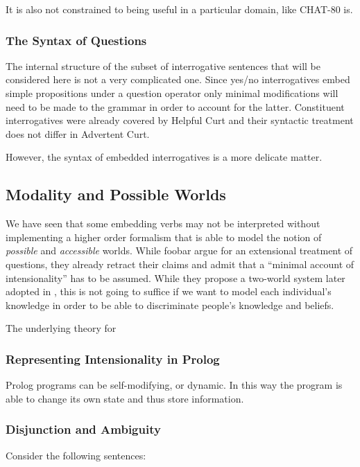 \documentclass[a4paper]{article}
\newcommand{\pn}{\textsf} %
\newcommand{\acurt}{\pn{Advertent Curt}}
\newcommand{\prol}{\pn{Prolog}}
\theoremstyle{remark}
\theoremstyle{remark}
\theoremstyle{definition}
\theoremstyle{definition}
\begin{document}
It is also not constrained to being useful in a particular domain, like
\pn{CHAT-80} is.

\subsubsection{The Syntax of Questions}

The internal structure of the subset of interrogative sentences that will be
considered here is not a very complicated one. Since yes/no interrogatives  embed
simple propositions under a question operator only minimal modifications will
need to be made to the grammar in order to account for the latter. Constituent
interrogatives were already covered by \pn{Helpful Curt} and their syntactic
treatment does not differ in \acurt{}.

However, the syntax of embedded interrogatives is a more delicate matter.

\subsection{Modality and Possible Worlds}
\label{sec:indices}

We have seen that some embedding verbs may not be interpreted without
implementing a higher order formalism that is able to model the notion of
\emph{possible} and \emph{accessible} worlds. While foobar %
argue for an extensional treatment of questions, they already %
retract their claims and admit that a ``minimal account of intensionality'' has
to be assumed. While they propose a two-world system later adopted in
\cite{g:is}, this is not going to suffice if we want to model each individual's
knowledge in order to be able to discriminate people's knowledge and beliefs.

The underlying theory for 

\subsubsection{Representing Intensionality in \prol{}}

\prol{} programs can be self-modifying, or dynamic. In this way the program is
able to change its own state and thus store information.

\subsubsection{Disjunction and Ambiguity}
Consider the following sentences:
\end{document}
